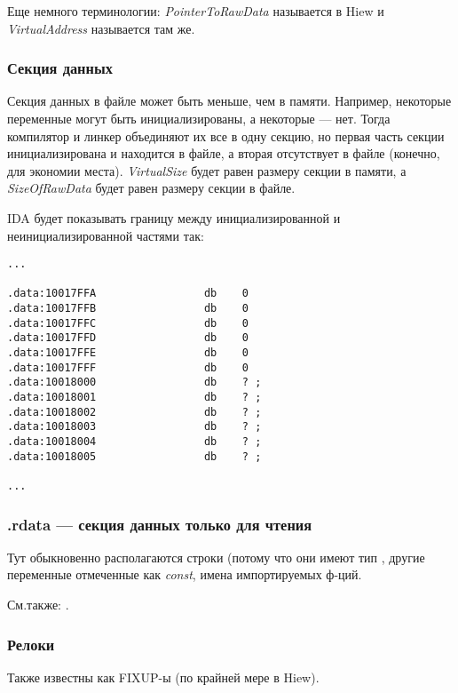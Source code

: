 Еще немного терминологии: \emph{PointerToRawData} называется  в Hiew и \emph{VirtualAddress} называется  там же.

\subsubsection{Секция данных}

Секция данных в файле может быть меньше, чем в памяти.
Например, некоторые переменные могут быть инициализированы, а некоторые --- нет.
Тогда компилятор и линкер объединяют их все в одну секцию, но первая часть секции инициализирована и находится в файле,
а вторая отсутствует в файле (конечно, для экономии места).
\emph{VirtualSize} будет равен размеру секции в памяти, а \emph{SizeOfRawData} будет равен размеру секции в файле.

IDA будет показывать границу между инициализированной и неинициализированной частями так:

\begin{lstlisting}[style=customasmx86]
...

.data:10017FFA                 db    0
.data:10017FFB                 db    0
.data:10017FFC                 db    0
.data:10017FFD                 db    0
.data:10017FFE                 db    0
.data:10017FFF                 db    0
.data:10018000                 db    ? ;
.data:10018001                 db    ? ;
.data:10018002                 db    ? ;
.data:10018003                 db    ? ;
.data:10018004                 db    ? ;
.data:10018005                 db    ? ;

...
\end{lstlisting}

\subsubsection{.rdata --- секция данных только для чтения}

Тут обыкновенно располагаются строки (потому что они имеют тип , другие переменные отмеченные как \emph{const},
имена импортируемых ф-ций.

См.также: .

\subsubsection{Релоки}
\label{subsec:relocs}

Также известны как FIXUP-ы (по крайней мере в Hiew).

